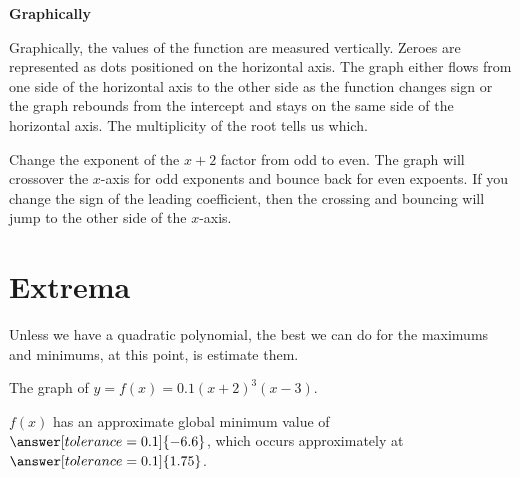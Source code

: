 \documentclass{ximera}
\begin{document}
\textbf{\large Graphically}


Graphically, the values of the function are measured vertically. Zeroes are represented as dots positioned on the horizontal axis.  The graph either flows from one side of the horizontal axis to the other side as the function changes sign or the graph rebounds from the intercept and stays on the same side of the horizontal axis.  The multiplicity of the root tells us which.






\begin{example}

Change the exponent of the $x+2$ factor from odd to even.  The graph will crossover the $x$-axis for odd exponents and bounce back for even expoents.  If you change the sign of the leading coefficient, then the crossing and bouncing will jump to the other side of the $x$-axis.



\begin{center}
\end{center}

\end{example}






















\section{Extrema}

Unless we have a quadratic polynomial, the best we can do for the maximums and minimums, at this point, is estimate them.







\begin{example}

The graph of $y = f(x) = 0.1(x+2)^3(x-3)$.



\begin{center}
\end{center}



$f(x)$ has an approximate global minimum value of $\answer[tolerance=0.1]{-6.6}$, which occurs approximately at $\answer[tolerance=0.1]{1.75}$.


\end{example}
\end{document}
